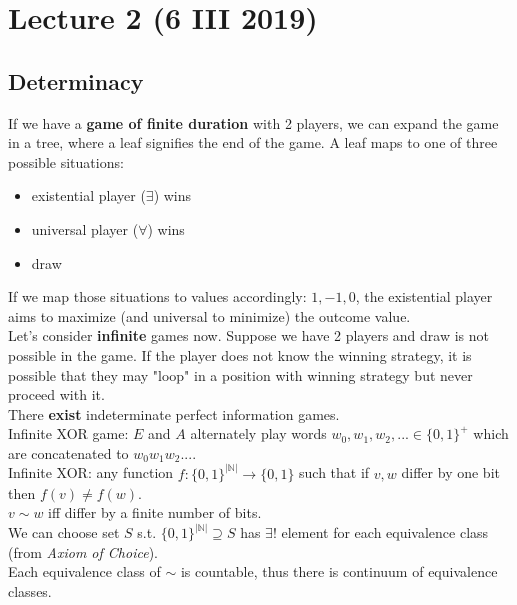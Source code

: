 \section{Lecture 2 (6 III 2019)}
\subsection*{Determinacy}
If we have a \textbf{game of finite duration} with 2 players, we can expand the
game in a tree, where a leaf signifies the end of the game. A leaf maps to one of
three possible situations:
\begin{itemize}
	\item existential player ($\exists$) wins
	\item universal player ($\forall$) wins
	\item draw
\end{itemize}
If we map those situations to values accordingly: $1, -1, 0$, the existential
player aims to maximize (and universal to minimize) the outcome value.\\

\noindent
Let's consider \textbf{infinite} games now. Suppose we have 2 players and draw is
not possible in the game. If the player does not know the winning strategy, it is
possible that they may "loop" in a position with winning strategy but never proceed
with it.\\

\noindent
There \textbf{exist} indeterminate perfect information games.\\

\noindent
Infinite XOR game: $E$ and $A$ alternately play words $w_0, w_1, w_2, ... \in \{0, 1\}^{+}$
which are concatenated to $w_0w_1w_2...$.\\

\noindent
Infinite XOR: any function $f: \{0, 1\}^{|\mathbb{N}|} \rightarrow \{0, 1\}$ such that
if $v, w$ differ by one bit then $f(v) \neq f(w)$.\\
$v \sim w$ iff differ by a finite number of bits.\\
We can choose set $S$ s.t. $\{0, 1\}^{|\mathbb{N}|} \supseteq S$ has $\exists!$ element for each equivalence class (from \textit{Axiom of Choice}).\\
Each equivalence class of $\sim$ is countable, thus there is continuum of equivalence classes.

